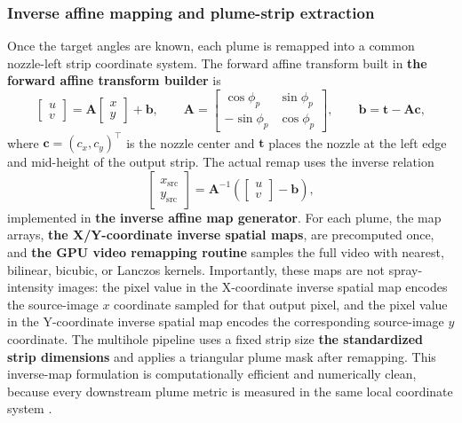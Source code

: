 \documentclass[english, 12pt, a4paper, elec, utf8, a-2b, online]{aaltothesis}
\begin{document}
\subsubsection{Inverse affine mapping and plume-strip extraction}

Once the target angles are known, each plume is remapped into a common nozzle-left strip coordinate system. The forward affine transform built in \textbf{the forward affine transform builder} is
\[
\begin{bmatrix}
u\\v
\end{bmatrix}
=
\mathbf{A}
\begin{bmatrix}
x\\y
\end{bmatrix}
+\mathbf{b},
\qquad
\mathbf{A}
=
\begin{bmatrix}
\cos\phi_p & \sin\phi_p\\
-\sin\phi_p & \cos\phi_p
\end{bmatrix},
\qquad
\mathbf{b}=\mathbf{t}-\mathbf{A}\mathbf{c},
\]
where \(\mathbf{c}=(c_x,c_y)^\top\) is the nozzle center and \(\mathbf{t}\) places the nozzle at the left edge and mid-height of the output strip. The actual remap uses the inverse relation
\[
\begin{bmatrix}
x_{\mathrm{src}}\\y_{\mathrm{src}}
\end{bmatrix}
=
\mathbf{A}^{-1}
\left(
\begin{bmatrix}
u\\v
\end{bmatrix}
-\mathbf{b}
\right),
\]
implemented in \textbf{the inverse affine map generator}. For each plume, the map arrays, \textbf{the X/Y-coordinate inverse spatial maps}, are precomputed once, and \textbf{the GPU video remapping routine} samples the full video with nearest, bilinear, bicubic, or Lanczos kernels. Importantly, these maps are not spray-intensity images: the pixel value in the X-coordinate inverse spatial map encodes the source-image \(x\) coordinate sampled for that output pixel, and the pixel value in the Y-coordinate inverse spatial map encodes the corresponding source-image \(y\) coordinate. The multihole pipeline uses a fixed strip size \textbf{the standardized strip dimensions} and applies a triangular plume mask after remapping. This inverse-map formulation is computationally efficient and numerically clean, because every downstream plume metric is measured in the same local coordinate system \cite{Szeliski2010Vision}.
\end{document}
